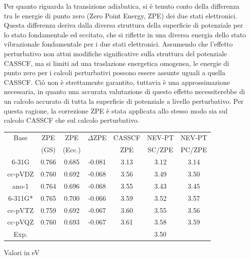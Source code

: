 Per quanto riguarda la transizione adiabatica, si \`e tenuto conto della differenza
tra le energie di punto zero (Zero Point Energy, ZPE) dei due stati elettronici. Questa differenza deriva
dalla diversa struttura della superficie di potenziale per lo stato fondamentale ed
eccitato, che si riflette in una diversa energia dello stato vibrazionale
fondamentale per i due stati elettronici. Assumendo che l'effetto perturbativo non attui modifiche
significative sulla struttura del potenziale CASSCF, ma si limiti ad una
traslazione energetica omogenea, le energie di punto zero per i calcoli
perturbativi possono essere assunte uguali a quella CASSCF. 
Ci\`o non \`e strettamente garantito, tuttavia \`e una approssimazione necessaria,
in quanto una accurata valutazione di questo effetto necessiterebbe di un
calcolo accurato di tutta la superficie di potenziale a livello
perturbativo.
Per questa ragione, la correzione ZPE
\`e stata applicata allo stesso modo sia sul calcolo CASSCF che sul calcolo 
perturbativo.

\begin{center}
\begin{threeparttable}
\caption{\small Formaldeide - Energia di transizione $n_y \rightarrow \pistar$ adiabatica di singoletto, calcolata a livello CASSCF e NEV-PT}
\label{tab:formaldeide_basis_energy}
{
\small
\begin{tabular}{|c|cccccc|}
\hline
Base	& ZPE 			& ZPE 				& $\Delta$ZPE	& CASSCF	& NEV-PT	& NEV-PT \\
		& (GS)			& (Ecc.)			& 				& ZPE 		&   SC/ZPE 	& PC/ZPE \\
\hline
6-31G	& 0.766			& 0.685				& -0.081		&  3.13		& 3.12			  & 3.14			\\
cc-pVDZ & 0.760			& 0.692				& -0.068        &  3.56		& 3.49			  & 3.50			\\
ano-1	& 0.764			& 0.696				& -0.068		&  3.55		& 3.43			  & 3.45			\\
6-311G* & 0.765			& 0.700				& -0.066		&  3.59		& 3.52			  & 3.57			\\
cc-pVTZ & 0.759         & 0.692				& -0.067		&  3.60		& 3.55			  & 3.56			\\
cc-pVQZ & 0.760			& 0.693				& -0.067		&  3.61		& 3.58			  & 3.59			\\
\hline
\hline
Exp.	&				& 					& 				& \multicolumn{3}{c|}{3.50}						\\
\hline
\end{tabular}
}
\begin{tablenotes}
\small
 \item[ ] Valori in eV
\end{tablenotes}
\end{threeparttable}
\end{center}

